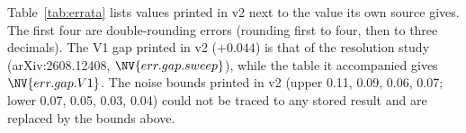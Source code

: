 \documentclass[10pt,twocolumn]{article}
\newcommand{\newid}{arXiv:2608.12408}
\begin{document}
Table~\ref{tab:errata} lists values printed in v2 next to the value its own source gives. The first four are double-rounding errors (rounding first to four, then to three decimals). The V1 gap printed in v2 ($+0.044$) is that of the resolution study (\newid, $\NV{err.gap.sweep}$), while the table it accompanied gives $\NV{err.gap.V1}$. The noise bounds printed in v2 (upper 0.11, 0.09, 0.06, 0.07; lower 0.07, 0.05, 0.03, 0.04) could not be traced to any stored result and are replaced by the bounds above.

\begin{table}[t]
\centering
\caption{Errata of v2: printed value and the value of its source (original analysis).}
\label{tab:errata}
\small

\end{table}


\end{document}
